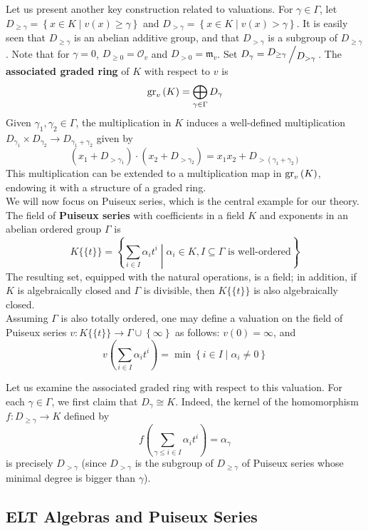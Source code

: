 Let us present another key construction related to valuations. For $\gamma\in\Gamma$, let $D_{\ge\gamma}=\left\{x\in K\middle|v\left(x\right)\ge\gamma\right\}$ and $D_{>\gamma}=\left\{x\in K\middle|v\left(x\right)>\gamma\right\}$. It is easily seen that $D_{\ge\gamma}$ is an abelian additive group, and that $D_{>\gamma}$ is a subgroup of $D_{\ge\gamma}$. Note that for $\gamma=0$, $D_{\ge 0}=\mathcal{O}_v$ and $D_{>0}=\mathfrak{m}_v$. Set $D_\gamma=\quo{D_{\ge\gamma}}{D_{>\gamma}}$. The \textbf{associated graded ring} of $K$ with respect to $v$ is
$$\mathrm{gr}_v\left(K\right)=\bigoplus_{\gamma\in\Gamma}D_\gamma$$
Given $\gamma_1,\gamma_2\in\Gamma$, the multiplication in $K$ induces a well-defined multiplication $D_{\gamma_1}\times D_{\gamma_2}\to D_{\gamma_1+\gamma_2}$ given by
$$\left(x_1+D_{>\gamma_1}\right)\cdot\left(x_2+D_{>\gamma_2}\right)=x_1x_2+D_{>\left(\gamma_1+\gamma_2\right)}$$
This multiplication can be extended to a multiplication map in $\mathrm{gr}_v\left(K\right)$, endowing it with a structure of a graded ring.\\

We will now focus on Puiseux series, which is the central example for our theory. The field of \textbf{Puiseux series} with coefficients in a field $K$ and exponents in an abelian ordered group $\Gamma$ is
$$K\{\{t\}\}=\left\{\sum_{i\in I}\alpha_i t^i\middle|\alpha_i\in K, I\subseteq \Gamma\text{ is well-ordered}\right\}$$
The resulting set, equipped with the natural operations, is a field; in addition, if $K$ is algebraically closed and $\Gamma$ is divisible, then $K\{\{t\}\}$ is also algebraically closed.\\

Assuming $\Gamma$ is also totally ordered, one may define a valuation on the field of Puiseux series $v:K\{\{t\}\}\to\Gamma\cup\left\{\infty\right\}$ as follows: $v\left(0\right)=\infty$, and
$$v\left(\sum_{i\in I}\alpha_i t^i\right)=\min\left\{i\in I\middle|\alpha_i\neq 0\right\}$$

Let us examine the associated graded ring with respect to this valuation. For each $\gamma\in\Gamma$, we first claim that $D_\gamma\cong K$. Indeed, the kernel of the homomorphism $f:D_{\ge\gamma}\to K$ defined by
$$f\left(\sum_{\gamma\leq i\in I}\alpha_i t^i\right)=\alpha_\gamma$$
is precisely $D_{>\gamma}$ (since $D_{>\gamma}$ is the subgroup of $D_{\ge\gamma}$ of Puiseux series whose minimal degree is bigger than $\gamma$).

\subsection{ELT Algebras and Puiseux Series}

